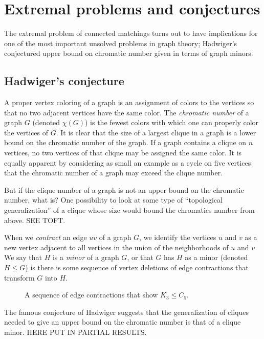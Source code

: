 \chapter{Extremal problems and conjectures}

The extremal problem of connected matchings turns out to have implications for one of the most important unsolved problems in graph theory; Hadwiger's conjectured upper bound on chromatic number given in terms of graph minors.  

\section{Hadwiger's conjecture}

A proper vertex coloring of a graph is an assignment of colors to the vertices so that no two adjacent vertices have the same color.  The {\it chromatic number} of a graph $G$ (denoted $\chi(G)$) is the fewest colors with which one can properly color the vertices of $G$. It is clear that the size of a largest clique in a graph is a lower bound on the chromatic number of the graph.  If a graph contains a clique on $n$ vertices, no two vertices of that clique may be assigned the same color.  It is equally apparent by considering as small an example as a cycle on five vertices that the chromatic number of a graph may exceed the clique number.    

But if the clique number of a graph is not an upper bound on the chromatic number, what is?  One possibility to look at some type of ``topological generalization'' of a clique whose size would bound the chromatics number from above.  SEE TOFT.  

When we {\it contract} an edge $uv$ of a graph $G$, we identify the vertices $u$ and $v$ as a new vertex adjacent to all vertices in the union of the neighborhoods of $u$ and $v$ We say that $H$ is a {\it minor} of a graph $G$, or that $G$ has $H$ as a minor (denoted $H \leq G$) is there is some sequence of vertex deletions of edge contractions that transform $G$ into $H$.  
\begin{figure}
	\begin{center}
	\hspace{0.5cm}
	\hspace{0.2cm}
	
	\end{center}
	\caption{A sequence of edge contractions that show $K_3 \leq C_5$.}
	\label{minorex}
\end{figure}
The famous conjecture of Hadwiger suggests that the generalization of cliques needed to give an upper bound on the chromatic number is that of a clique minor.
  HERE PUT IN PARTIAL RESULTS.

